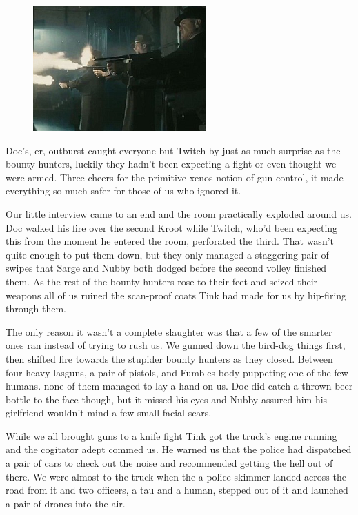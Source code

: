 \begin{figure}
	\begin{center}
		\includegraphics[width=\figwidth]{pics/10/27.png}
	\end{center}
\end{figure}
Doc's, er, outburst caught everyone but Twitch by just as much surprise as the bounty hunters, luckily they hadn't been expecting a fight or even thought we were armed. 
Three cheers for the primitive xenos notion of gun control, it made everything so much safer for those of us who ignored it.

Our little interview came to an end and the room practically exploded around us. 
Doc walked his fire over the second Kroot while Twitch, who'd been expecting this from the moment he entered the room, perforated the third. 
That wasn't quite enough to put them down, but they only managed a staggering pair of swipes that Sarge and Nubby both dodged before the second volley finished them. 
As the rest of the bounty hunters rose to their feet and seized their weapons all of us ruined the scan-proof coats Tink had made for us by hip-firing through them. 


The only reason it wasn't a complete slaughter was that a few of the smarter ones ran instead of trying to rush us. 
We gunned down the bird-dog things first, then shifted fire towards the stupider bounty hunters as they closed. 
Between four heavy lasguns, a pair of pistols, and Fumbles body-puppeting one of the few humans. 
none of them managed to lay a hand on us. 
Doc did catch a thrown beer bottle to the face though, but it missed his eyes and Nubby assured him his girlfriend wouldn't mind a few small facial scars.

While we all brought guns to a knife fight Tink got the truck's engine running and the cogitator adept commed us. 
He warned us that the police had dispatched a pair of cars to check out the noise and recommended getting the hell out of there. 
We were almost to the truck when the a police skimmer landed across the road from it and two officers, a tau and a human, stepped out of it and launched a pair of drones into the air.

